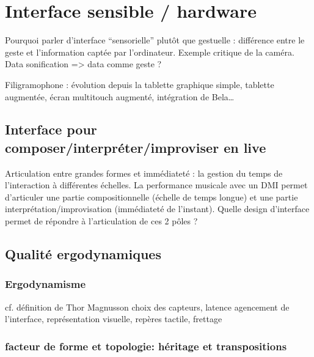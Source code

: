 %
\chapter{Interface sensible / hardware}
\label{ch:interfaces}





Pourquoi parler d’interface “sensorielle” plutôt que gestuelle : différence entre le geste et l’information captée par l’ordinateur. Exemple critique de la caméra. Data sonification => data comme geste ?

Filigramophone : évolution depuis la tablette graphique simple, tablette augmentée, écran multitouch augmenté, intégration de Bela…

\section{Interface pour composer/interpréter/improviser en live}
Articulation entre grandes formes et immédiateté : la gestion du temps de l’interaction à différentes échelles.
La performance musicale avec un DMI permet d’articuler une partie compositionnelle (échelle de temps longue) et une partie interprétation/improvisation (immédiateté de l’instant). 
Quelle design d’interface permet de répondre à l’articulation de ces 2 pôles ? 

\section{Qualité ergodynamiques}
\subsection{Ergodynamisme}
cf. définition de Thor Magnusson
choix des capteurs, latence
agencement de l’interface, représentation visuelle, repères tactile, frettage

\subsection{facteur de forme et topologie: héritage et transpositions}

